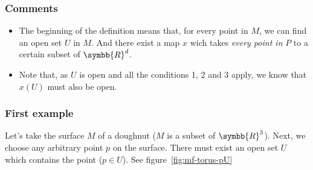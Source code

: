 \subsubsection{Comments}
\begin{itemize}
\item The beginning of the definition means that, for every point in $M$, we can find an open
  set $U$ in $M$. And there exist a map $x$ wich takes \emph{every point in} $P$ to a certain
  subset of $\symbb{R}^d$.
\item Note that, as $U$ is open and all the conditions 1, 2 and 3 apply, we know that $x(U)$ must
  also be open.
\end{itemize}

\subsubsection{First example}
Let's take the surface $M$ of a doughnut ($M$ is a subset of $\symbb{R}^3$). Next, we choose any
arbitrary point $p$ on the surface. There must exist an open set $U$ which contains the point
($p\in U$). See figure~\ref{fig:mf-torus-pU}
